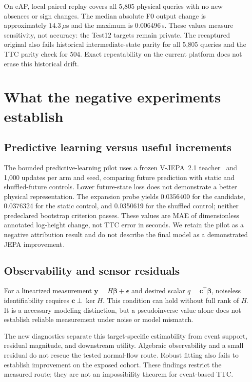 \documentclass[twocolumn,letterpaper]{article}
\begin{document}
On eAP, local paired replay covers all 5,805 physical queries with no new absences or sign changes. The median absolute F0 output change is approximately $14.3\,\mu$s and the maximum is 0.006496\,s. These values measure sensitivity, not accuracy: the Test12 targets remain private. The recaptured original also fails historical intermediate-state parity for all 5,805 queries and the TTC parity check for 504. Exact repeatability on the current platform does not erase this historical drift.

\section{What the negative experiments establish}
\subsection{Predictive learning versus useful increments}
\EvidenceJepaTable
The bounded predictive-learning pilot uses a frozen V-JEPA~2.1 teacher~\citep{vjepa21} and 1,000 updates per arm and seed, comparing future prediction with static and shuffled-future controls. Lower future-state loss does not demonstrate a better physical representation. The expansion probe yields 0.0356400 for the candidate, 0.0376324 for the static control, and 0.0350619 for the shuffled control; neither predeclared bootstrap criterion passes. These values are MAE of dimensionless annotated log-height change, not TTC error in seconds. We retain the pilot as a negative attribution result and do not describe the final model as a demonstrated JEPA improvement.

\subsection{Observability and sensor residuals}
For a linearized measurement $\mathbf y=H\boldsymbol\beta+\boldsymbol\epsilon$ and desired scalar $q=\mathbf c^\top\boldsymbol\beta$, noiseless identifiability requires $\mathbf c\perp\ker H$. This condition can hold without full rank of $H$. It is a necessary modeling distinction, but a pseudoinverse value alone does not establish reliable measurement under noise or model mismatch.

The new diagnostics separate this target-specific estimability from event support, residual magnitude, and downstream utility. Algebraic observability and a small residual do not rescue the tested normal-flow route. Robust fitting also fails to establish improvement on the exposed cohort. These findings restrict the measured route; they are not an impossibility theorem for event-based TTC.
\end{document}

